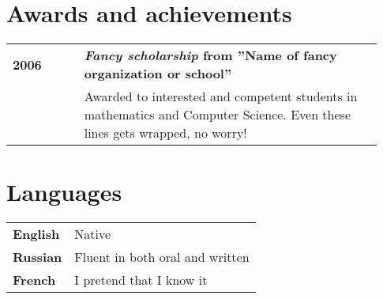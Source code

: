 \documentclass[letterpaper]{article}
\def\rightcolumnwidth{0.75\linewidth}
\def\leftcolumnwidth{0.18\linewidth}
\begin{document}
\section*{Awards and achievements}
\begin{tabular}{p{\leftcolumnwidth} p{\rightcolumnwidth}}
    {\bf 2006} & {\bf \emph{Fancy scholarship} from
                  ''Name of fancy organization or school''} \\
               & Awarded to interested and competent students in mathematics
                 and Computer Science. Even these lines gets wrapped, no worry!
\end{tabular}


\section*{Languages}
\begin{tabular}{l l}
    {\bf English} & Native \\
    {\bf Russian} & Fluent in both oral and written \\
    {\bf French}  & I pretend that I know it
\end{tabular}
\end{document}
